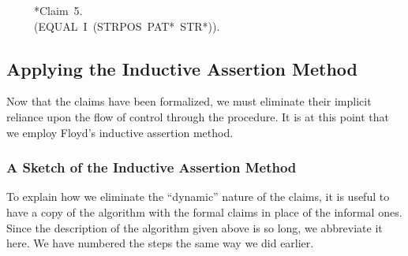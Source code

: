 \documentclass[10pt]{book}
\newenvironment{pubasis}{\begin{flushleft}}{\end{flushleft}}
\begin{document}
\begin{pubasis}
~~~~~*Claim~5.\\
~~~~~(EQUAL~I~(STRPOS~PAT*~STR*)).\\
\end{pubasis}
\subsection{Applying the Inductive Assertion Method}
Now that the claims have been formalized, we must eliminate their
implicit reliance upon the flow of control through the procedure.
It is at this point that we employ Floyd's inductive assertion method.

\subsubsection{A Sketch of the Inductive Assertion Method}
To explain how we eliminate the ``dynamic'' nature of the claims,
it is useful to have a copy of the algorithm
with the formal claims in place of the informal ones.  Since the
description of the algorithm given above
is so long, we 
abbreviate it here.  We have numbered the steps the same
way we did earlier.
\end{document}
